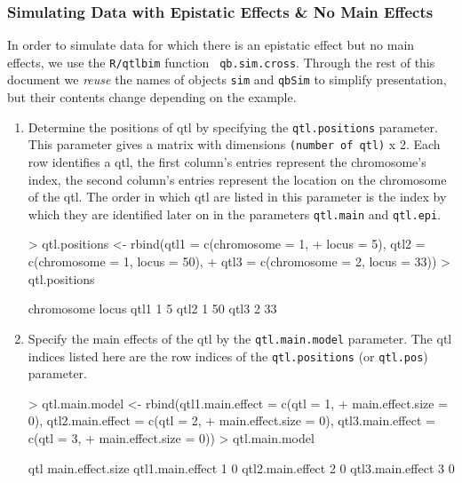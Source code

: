 \documentclass[12pt]{article}
\begin{document}
\subsubsection{Simulating Data with Epistatic Effects \& No Main 
Effects}
In order to simulate data for which there is an epistatic effect but no 
main effects, we use the {\tt R/qtlbim} function {\tt
qb.sim.cross}. Through the rest of this document we {\it reuse} the
names of objects {\tt sim} and {\tt qbSim} to simplify presentation,
but their contents change depending on the example.
\begin{enumerate}
\item Determine the positions of qtl by specifying the 
 {\tt qtl.positions} parameter. This parameter gives a matrix with 
dimensions {\tt (number of qtl)} x 2.  Each row identifies a qtl, 
the first column's entries represent the chromosome's index, the second 
column's entries represent the location on the chromosome of the qtl.   
The order in which qtl are listed in this parameter is the  index by 
which they are identified later on in the parameters 
{\tt qtl.main} and {\tt qtl.epi}.
\begin{Schunk}
\begin{Sinput}
> qtl.positions <- rbind(qtl1 = c(chromosome = 1, 
+     locus = 5), qtl2 = c(chromosome = 1, locus = 50), 
+     qtl3 = c(chromosome = 2, locus = 33))
> qtl.positions
\end{Sinput}
\begin{Soutput}
     chromosome locus
qtl1          1     5
qtl2          1    50
qtl3          2    33
\end{Soutput}
\end{Schunk}
\item Specify the main effects of the qtl by the {\tt qtl.main.model} 
parameter. The qtl indices listed here are the row indices of the 
{\tt qtl.positions} (or {\tt qtl.pos}) parameter.
\begin{Schunk}
\begin{Sinput}
> qtl.main.model <- rbind(qtl1.main.effect = c(qtl = 1, 
+     main.effect.size = 0), qtl2.main.effect = c(qtl = 2, 
+     main.effect.size = 0), qtl3.main.effect = c(qtl = 3, 
+     main.effect.size = 0))
> qtl.main.model
\end{Sinput}
\begin{Soutput}
                 qtl main.effect.size
qtl1.main.effect   1                0
qtl2.main.effect   2                0
qtl3.main.effect   3                0
\end{Soutput}

\end{Schunk}
\end{enumerate}
\end{document}
